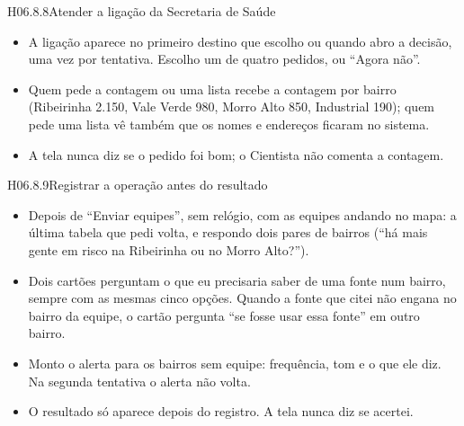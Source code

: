 \begin{historia}{H06.8.8}{Atender a ligação da Secretaria de Saúde}{\pronto}
\aceite
\begin{itemize}
  \item A ligação aparece no primeiro destino que escolho ou quando abro a
    decisão, uma vez por tentativa. Escolho um de quatro pedidos, ou
    \enquote{Agora não}.
  \item Quem pede a contagem ou uma lista recebe a contagem por bairro
    (Ribeirinha 2.150, Vale Verde 980, Morro Alto 850, Industrial 190); quem
    pede uma lista vê também que os nomes e endereços ficaram no sistema.
  \item A tela nunca diz se o pedido foi bom; o Cientista não comenta a
    contagem.
\end{itemize}
\end{historia}

\begin{historia}{H06.8.9}{Registrar a operação antes do resultado}{\pronto}
\aceite
\begin{itemize}
  \item Depois de \enquote{Enviar equipes}, sem relógio, com as equipes
    andando no mapa: a última tabela que pedi volta, e respondo dois pares de
    bairros (\enquote{há mais gente em risco na Ribeirinha ou no Morro Alto?}).
  \item Dois cartões perguntam o que eu precisaria saber de uma fonte num
    bairro, sempre com as mesmas cinco opções. Quando a fonte que citei não
    engana no bairro da equipe, o cartão pergunta \enquote{se fosse usar essa
    fonte} em outro bairro.
  \item Monto o alerta para os bairros sem equipe: frequência, tom e o que ele
    diz. Na segunda tentativa o alerta não volta.
  \item O resultado só aparece depois do registro. A tela nunca diz se acertei.
\end{itemize}
\end{historia}

